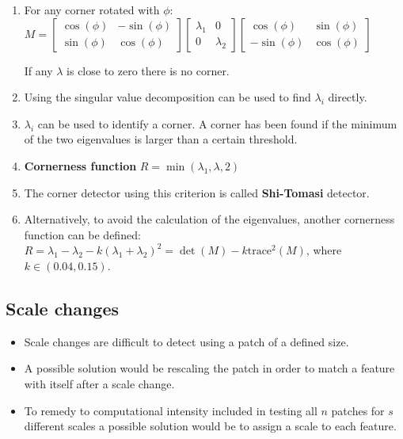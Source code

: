 \documentclass[10pt,a4paper]{scrartcl}
\begin{document}
\begin{multicols*}{2}
\begin{enumerate}
\item For any corner rotated with $\phi$: $M=\begin{bmatrix}
\cos(\phi)&-\sin(\phi)\\\sin(\phi)&\cos(\phi)
\end{bmatrix}
\begin{bmatrix}
\lambda_1&0\\0&\lambda_2
\end{bmatrix}
\begin{bmatrix}
\cos(\phi)&\sin(\phi)\\-\sin(\phi)&\cos(\phi)
\end{bmatrix}$

If any $\lambda$ is close to zero there is no corner.

\item Using the singular value decomposition can be used to find $\lambda_i$ directly.
\item $\lambda_i$ can be used to identify a corner. A corner has been found if the minimum of the two eigenvalues is larger than a certain threshold.
\item \textbf{Cornerness function} $R=\min(\lambda_1,\lambda,2)$

\item The corner detector using this criterion is called \textbf{Shi-Tomasi} detector.
\item Alternatively, to avoid the calculation of the eigenvalues, another cornerness function can be defined: $R=\lambda_1-\lambda_2-k(\lambda_1+\lambda_2)^2=\det(M)-k\text{trace}^2(M)$, where $k\in(0.04,0.15)$.
\end{enumerate}



\subsection{Scale changes}

\begin{itemize}
\item Scale changes are difficult to detect using a patch of a defined size.
\item A possible solution would be rescaling the patch in order to match a feature with itself after a scale change.
\item To remedy to computational intensity included in testing all $n$ patches for $s$ different scales a possible solution would be to assign a scale to each feature.
\end{itemize}


\end{multicols*}
\end{document}
